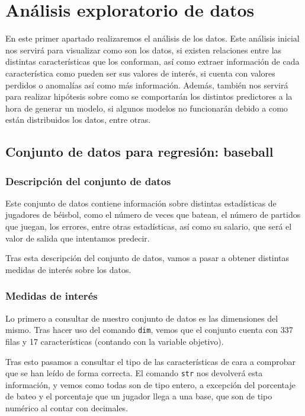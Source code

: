 \section{Análisis exploratorio de datos}

En este primer apartado realizaremos el análisis de los datos. Este análisis inicial nos servirá para visualizar como son los datos, si existen relaciones entre las distintas características que los conforman, así como extraer información de cada característica como pueden ser sus valores de interés, si cuenta con valores perdidos o anomalías así como más información. Además, también nos servirá para realizar hipótesis sobre como se comportarán los distintos predictores a la hora de generar un modelo, si algunos modelos no funcionarán debido a como están distribuidos los datos, entre otras.

\subsection{Conjunto de datos para regresión: baseball}

\subsubsection{Descripción del conjunto de datos}

Este conjunto de datos contiene información sobre distintas estadísticas de jugadores de béisbol, como el número de veces que batean, el número de partidos que juegan, los errores, entre otras estadísticas, así como su salario, que será el valor de salida que intentamos predecir.

Tras esta descripción del conjunto de datos, vamos a pasar a obtener distintas medidas de interés sobre los datos.


\subsubsection{Medidas de interés}

Lo primero a consultar de nuestro conjunto de datos es las dimensiones del mismo. Tras hacer uso del comando \texttt{dim}, vemos que el conjunto cuenta con 337 filas y 17 características (contando con la variable objetivo).

Tras esto pasamos a consultar el tipo de las características de cara a comprobar que se han leído de forma correcta. El comando \texttt{str} nos devolverá esta información, y vemos como todas son de tipo entero, a excepción del porcentaje de bateo y el porcentaje que un jugador llega a una base, que son de tipo numérico al contar con decimales.

